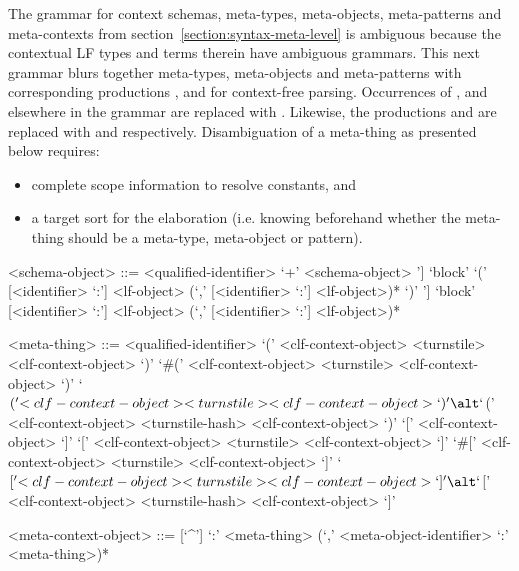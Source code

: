 The grammar for context schemas, meta-types, meta-objects, meta-patterns and meta-contexts from section~\ref{section:syntax-meta-level} is ambiguous because the contextual \ac{LF} types and terms therein have ambiguous grammars.
This next grammar blurs together meta-types, meta-objects and meta-patterns with corresponding productions ,  and  for context-free parsing.
Occurrences of ,  and  elsewhere in the grammar are replaced with .
Likewise, the productions  and  are replaced with  and  respectively.
Disambiguation of a meta-thing as presented below requires:
\begin{itemize}
\item complete scope information to resolve constants, and
\item a target sort for the elaboration (i.e. knowing beforehand whether the meta-thing should be a meta-type, meta-object or pattern).
\end{itemize}

\begin{grammar}
<schema-object> ::= <qualified-identifier>
 `+' <schema-object>
\alt [`some' `[' <identifier> `:' <lf-object> (`,' <identifier> `:' <lf-object>)* `]'] `block' `(' [<identifier> `:'] <lf-object> (`,' [<identifier> `:'] <lf-object>)* `)'
\alt [`some' `[' <identifier> `:' <lf-object> (`,' <identifier> `:' <lf-object>)* `]'] `block' [<identifier> `:'] <lf-object> (`,' [<identifier> `:'] <lf-object>)*

<meta-thing> ::= <qualified-identifier>
\alt `(' <clf-context-object> <turnstile> <clf-context-object> `)'
\alt `#(' <clf-context-object> <turnstile> <clf-context-object> `)'
\alt `$(' <clf-context-object> <turnstile> <clf-context-object> `)'
\alt `$(' <clf-context-object> <turnstile-hash> <clf-context-object> `)'
\alt `[' <clf-context-object> `]'
\alt `[' <clf-context-object> <turnstile> <clf-context-object> `]'
\alt `#[' <clf-context-object> <turnstile> <clf-context-object> `]'
\alt `$[' <clf-context-object> <turnstile> <clf-context-object> `]'
\alt `$[' <clf-context-object> <turnstile-hash> <clf-context-object> `]'

<meta-context-object> ::= [`^']
 `:' <meta-thing> (`,' <meta-object-identifier> `:' <meta-thing>)*
\end{grammar}

